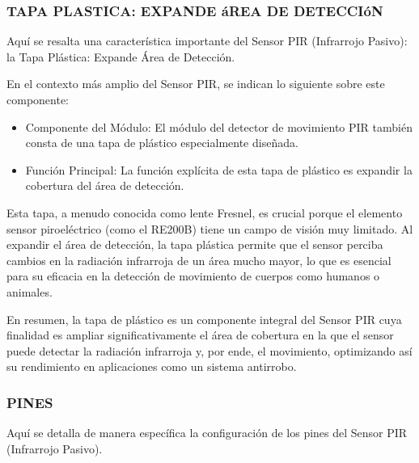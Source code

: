 \documentclass{report}
\begin{document}
\subsubsection{TAPA PLASTICA: EXPANDE áREA DE DETECCIóN}
Aquí se resalta una característica importante del Sensor PIR (Infrarrojo Pasivo): la Tapa Plástica: 
Expande Área de Detección.

En el contexto más amplio del Sensor PIR, se  indican lo siguiente sobre este componente:
\begin{itemize}
    \item Componente del Módulo: El módulo del detector de movimiento PIR también consta de una tapa de plástico especialmente diseñada.
    \item Función Principal: La función explícita de esta tapa de plástico es expandir la cobertura del área de detección.
\end{itemize}

Esta tapa, a menudo conocida como lente Fresnel, es crucial porque el elemento sensor piroeléctrico (como el RE200B) tiene un campo de visión muy limitado. 
Al expandir el área de detección, la tapa plástica permite que el sensor perciba cambios en la radiación infrarroja de un área mucho mayor, lo que es 
esencial para su eficacia en la detección de movimiento de cuerpos como humanos o animales.

En resumen, la tapa de plástico es un componente integral del Sensor PIR cuya finalidad es ampliar significativamente el área de cobertura 
en la que el sensor puede detectar la radiación infrarroja y, por ende, el movimiento, optimizando así su rendimiento en aplicaciones como un 
sistema antirrobo.

\subsubsection{PINES}
Aquí se detalla de manera específica la configuración de los pines del Sensor PIR (Infrarrojo Pasivo).
\end{document}
